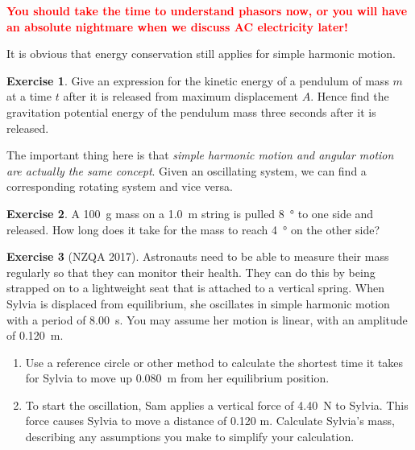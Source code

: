 \documentclass[a4paper]{amsbook}
\theoremstyle{definition}
\newtheorem{exercise}{Exercise}
\numberwithin{exercise}{chapter}
\numberwithin{exercise}{chapter}
\begin{document}
\textbf{\textcolor{red}{You should take the time to understand phasors now, or you will have an absolute nightmare when we discuss AC electricity later!}}

It is obvious that energy conservation still applies for simple harmonic motion.
\begin{exercise}
  Give an expression for the kinetic energy of a pendulum of mass $ m $ at a time $ t $ after it is released from maximum displacement $ A $.
  Hence find the gravitation potential energy of the pendulum mass three seconds after it is released.
\end{exercise}

The important thing here is that \emph{simple harmonic motion and angular motion are actually the same concept}. Given an oscillating system,
we can find a corresponding rotating system and vice versa.

\begin{exercise}
  A \SI{100}{\gram} mass on a \SI{1.0}{\metre} string is pulled \SI{8}{\degree} to one side and released. How long does it take for the
  mass to reach \SI{4}{\degree} on the other side?
\end{exercise}

\begin{exercise}
  [NZQA 2017] Astronauts need to be able to measure their mass regularly so that they can monitor their health. They can do this by being strapped
  on to a lightweight seat that is attached to a vertical spring. When Sylvia is displaced from equilibrium, she oscillates in simple harmonic motion
  with a period of \SI{8.00}{\second}. You may assume her motion is linear, with an amplitude of \SI{0.120}{\metre}.
  \begin{enumerate}
    \item Use a reference circle or other method to calculate the shortest time it takes for Sylvia to move up \SI{0.080}{\metre} from her
          equilibrium position.
    \item To start the oscillation, Sam applies a vertical force of \SI{4.40}{\newton} to Sylvia. This force causes Sylvia to move a distance
          of 0.120 m. Calculate Sylvia’s mass, describing any assumptions you make to simplify your calculation.
  \end{enumerate}
\end{exercise}
\end{document}
